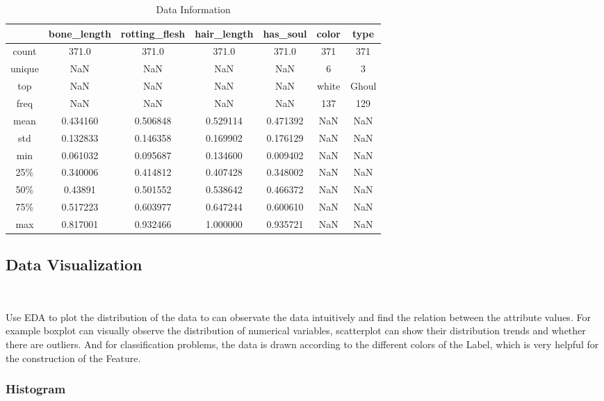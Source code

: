 \begin{table}[htbp]  \centering
	\caption{Data Information}
	\label{tbl:data information}
	\begin{tabular}{ccccccc}
		\hline
		& bone_length & rotting_flesh & hair_length & has_soul & color & type\\
		\hline
		count & 371.0 & 371.0 & 371.0 & 371.0 & 371 & 371 \\
		unique & NaN & NaN & NaN & NaN & 6 & 3 \\
		top & NaN & NaN & NaN & NaN & white & Ghoul \\
		freq & NaN & NaN & NaN & NaN & 137 & 129\\
		mean & 0.434160 & 0.506848 & 0.529114 & 0.471392 & NaN & NaN \\
		std & 0.132833 & 0.146358 & 0.169902 & 0.176129 & NaN & NaN \\
		min & 0.061032 & 0.095687 & 0.134600 & 0.009402 & NaN & NaN \\
		25\% & 0.340006 & 0.414812 & 0.407428 & 0.348002 & NaN & NaN \\
		50\% & 0.43891 & 0.501552 & 0.538642 & 0.466372 & NaN & NaN\\
		75\% & 0.517223 & 0.603977 & 0.647244 & 0.600610 & NaN & NaN\\
		max &  0.817001 & 0.932466 & 1.000000 & 0.935721 & NaN & NaN\\
		\hline 
	\end{tabular}
\end{table}


\subsection{Data Visualization}
\

Use EDA to plot the distribution of the data 
to can observate the data intuitively and
find the relation between the attribute values. 
For example boxplot can visually observe 
the distribution of numerical variables, 
scatterplot can show their distribution trends 
and whether there are outliers.
And for classification problems, 
the data is drawn according to 
the different colors of the Label, 
which is very helpful for 
the construction of the Feature.


\subsubsection{ Histogram}
\

